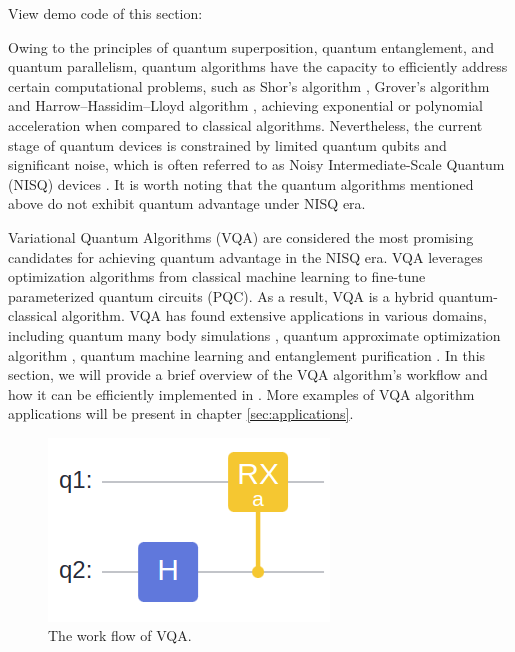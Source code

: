 View demo code of this section: 

Owing to the principles of quantum superposition, quantum entanglement, and quantum parallelism, quantum algorithms have the capacity to efficiently address certain computational problems, such as Shor's algorithm \cite{shor1994algorithms}, Grover's algorithm \cite{grover1996fast,long2001grover} and Harrow–Hassidim–Lloyd algorithm \cite{harrow2009quantum}, achieving exponential or polynomial acceleration when compared to classical algorithms. Nevertheless, the current stage of quantum devices is constrained by limited quantum qubits and significant noise, which is often referred to as Noisy Intermediate-Scale Quantum (NISQ) devices \cite{preskill2018quantum}. It is worth noting that the quantum algorithms mentioned above do not exhibit quantum advantage under NISQ era.

Variational Quantum Algorithms (VQA) \cite{cerezo2021variational,yuan2019theory,xu2021variational} are considered the most promising candidates for achieving quantum advantage in the NISQ era. VQA leverages optimization algorithms from classical machine learning to fine-tune parameterized quantum circuits (PQC). As a result, VQA is a hybrid quantum-classical algorithm. VQA has found extensive applications in various domains, including quantum many body simulations \cite{peruzzo2014variational,kandala2017hardware,kokail2019self,lyu2023variational,Lyu2023symmetryenhanced,cao2022progress}, quantum approximate optimization algorithm \cite{farhi2014quantum,patti2022variational,chandarana2023digitized}, quantum machine learning \cite{benedetti2019parameterized,wei2022quantum,lloyd2018quantum,biamonte2017quantum,abbas2021power} and entanglement purification \cite{zhang2023variational}. In this section, we will provide a brief overview of the VQA algorithm's workflow and how it can be efficiently implemented in \MindQuantum. More examples of VQA algorithm applications will be present in chapter \ref{sec:applications}.

\begin{figure}[h]
  \begin{center}
    \includegraphics[width=0.9\linewidth]{images/3_1_vqa.png}
  \end{center}
  \caption{The work flow of VQA.}
  \label{fig:vqa_work_flow}
\end{figure}

